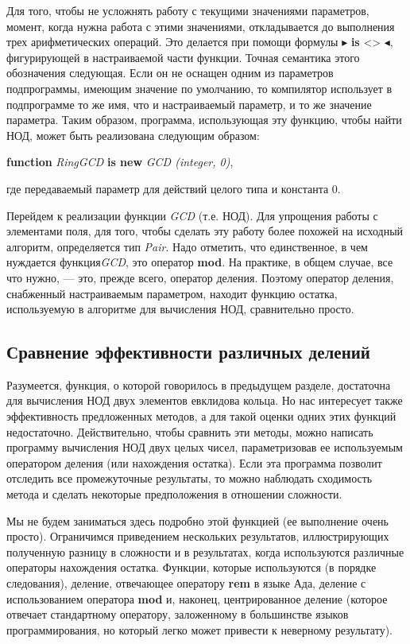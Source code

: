 \documentclass{mai_book}
\begin{document}
Для того, чтобы не усложнять работу с текущими значениями параметров, момент, когда нужна работа с этими значениями, откладывается до выполнения трех арифметических операций. Это делается при помощи формулы $\blacktriangleright$ \textbf{is} <> $\blacktriangleleft$, фигурирующей в настраиваемой части функции. Точная семантика этого обозначения следующая. Если он не оснащен одним из параметров подпрограммы, имеющим значение по умолчанию, то компилятор использует в подпрограмме то же имя, что и настраиваемый параметр, и то же значение параметра. Таким образом, программа, использующая эту функцию, чтобы найти НОД, может быть реализована следующим образом:\newline 

\textbf{function} \textit{Ring\textunderscore GCD} \textbf{is new} \textit{GCD (integer, 0)},\newline

\noindent где передаваемый параметр для действий целого типа и константа 0.\newline
 
Перейдем к реализации функции \textit{GCD} (т.е. НОД). Для упрощения 
работы с элементами поля, для того, чтобы сделать эту работу более 
похожей на исходный алгоритм, определяется тип \textit{Pair}. Надо отметить, 
что единственное, в чем нуждается функция\textit{GCD}, это оператор \textbf{mod}. 
На практике, в общем случае, все что нужно, — это, прежде всего,  
оператор деления. Поэтому оператор деления, снабженный настраиваемым 
параметром, находит функцию остатка, используемую в алгоритме для 
вычисления НОД, сравнительно просто. 

\subsection{Сравнение эффективности различных делений}
Разумеется, функция, о которой говорилось в предыдущем разделе, достаточна для вычисления НОД двух элементов евклидова кольца. Но нас интересует также эффективность предложенных методов, а для такой оценки одних этих функций недостаточно. Действительно, чтобы сравнить эти методы, можно написать программу вычисления НОД двух целых чисел, параметризовав ее используемым оператором деления (или нахождения остатка). Если эта программа позволит отследить все промежуточные результаты, то можно наблюдать сходимость метода и сделать некоторые предположения в отношении сложности.

 Мы не будем заниматься здесь подробно этой функцией (ее выполнение очень просто). Ограничимся приведением нескольких результатов, иллюстрирующих полученную разницу в сложности и в результатах, когда используются различные операторы нахождения остатка. Функции, которые используются (в порядке следования), деление, отвечающее оператору \textbf{rem} в языке Ада, деление с использованием оператора \textbf{mod} и, наконец, центрированное деление (которое отвечает стандартному оператору, заложенному в большинстве языков программирования, но который
легко может привести к неверному результату).
\pagebreak
\end{document}
